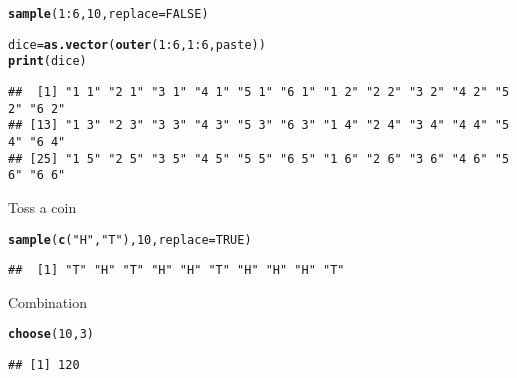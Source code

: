 \documentclass{article}\usepackage[]{graphicx}\usepackage[]{xcolor}
\makeatletter
\newcommand{\hlnum}[1]{\textcolor[rgb]{0.686,0.059,0.569}{#1}}%
\newcommand{\hlsng}[1]{\textcolor[rgb]{0.192,0.494,0.8}{#1}}%
\newcommand{\hlopt}[1]{\textcolor[rgb]{0,0,0}{#1}}%
\newcommand{\hldef}[1]{\textcolor[rgb]{0.345,0.345,0.345}{#1}}%
\newcommand{\hlkwb}[1]{\textcolor[rgb]{0.69,0.353,0.396}{#1}}%
\newcommand{\hlkwc}[1]{\textcolor[rgb]{0.333,0.667,0.333}{#1}}%
\newcommand{\hlkwd}[1]{\textcolor[rgb]{0.737,0.353,0.396}{\textbf{#1}}}%
\newenvironment{kframe}{%
 \def\at@end@of@kframe{}%
 \ifinner\ifhmode%
  \def\at@end@of@kframe{\end{minipage}}%
  \begin{minipage}{\columnwidth}%
 \fi\fi%
 \def\FrameCommand##1{\hskip\@totalleftmargin \hskip-\fboxsep
 \colorbox{shadecolor}{##1}\hskip-\fboxsep
     \hskip-\linewidth \hskip-\@totalleftmargin \hskip\columnwidth}%
 \MakeFramed {\advance\hsize-\width
   \@totalleftmargin\z@ \linewidth\hsize
   \@setminipage}}%
 {\par\unskip\endMakeFramed%
 \at@end@of@kframe}
\newenvironment{knitrout}{}{} %
\makeatother
\begin{document}
\begin{knitrout}
\color{fgcolor}\begin{kframe}
\begin{alltt}
\hlkwd{sample}\hldef{(}\hlnum{1}\hlopt{:}\hlnum{6}\hldef{,}\hlnum{10}\hldef{,}\hlkwc{replace}\hldef{=}\hlnum{FALSE}\hldef{)}
\end{alltt}


{\ttfamily\noindent\bfseries\color{errorcolor}{\#\# Error in sample.int(length(x), size, replace, prob): cannot take a sample larger than the population when 'replace = FALSE'}}\end{kframe}
\end{knitrout}
\begin{knitrout}
\color{fgcolor}\begin{kframe}
\begin{alltt}
\hldef{dice} \hlkwb{=} \hlkwd{as.vector}\hldef{(}\hlkwd{outer}\hldef{(}\hlnum{1}\hlopt{:}\hlnum{6}\hldef{,}\hlnum{1}\hlopt{:}\hlnum{6}\hldef{,paste))}
\hlkwd{print}\hldef{(dice)}
\end{alltt}
\begin{verbatim}
##  [1] "1 1" "2 1" "3 1" "4 1" "5 1" "6 1" "1 2" "2 2" "3 2" "4 2" "5 2" "6 2"
## [13] "1 3" "2 3" "3 3" "4 3" "5 3" "6 3" "1 4" "2 4" "3 4" "4 4" "5 4" "6 4"
## [25] "1 5" "2 5" "3 5" "4 5" "5 5" "6 5" "1 6" "2 6" "3 6" "4 6" "5 6" "6 6"
\end{verbatim}
\end{kframe}
\end{knitrout}
Toss a coin
\begin{knitrout}
\color{fgcolor}\begin{kframe}
\begin{alltt}
\hlkwd{sample}\hldef{(}\hlkwd{c}\hldef{(}\hlsng{"H"}\hldef{,}\hlsng{"T"}\hldef{),}\hlnum{10}\hldef{,}\hlkwc{replace}\hldef{=}\hlnum{TRUE}\hldef{)}
\end{alltt}
\begin{verbatim}
##  [1] "T" "H" "T" "H" "H" "T" "H" "H" "H" "T"
\end{verbatim}
\end{kframe}
\end{knitrout}
Combination
\begin{knitrout}
\color{fgcolor}\begin{kframe}
\begin{alltt}
\hlkwd{choose}\hldef{(}\hlnum{10}\hldef{,}\hlnum{3}\hldef{)}
\end{alltt}
\begin{verbatim}
## [1] 120
\end{verbatim}
\end{kframe}
\end{knitrout}
\end{document}
